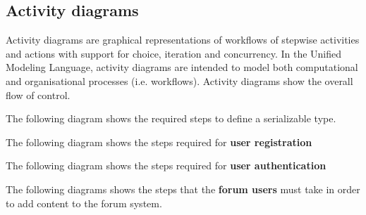 \documentclass[12pt]{report}
\renewcommand\emph{\textbf}
\begin{document}
            \subsection{Activity diagrams}
                Activity diagrams are graphical representations of workflows of stepwise activities and actions with support for choice, iteration and concurrency.
                In the Unified Modeling Language, activity diagrams are intended to model both computational and organisational processes (i.e. workflows).
                Activity diagrams show the overall flow of control.

                \newpage

                The following diagram shows the required steps to define a serializable type.


                \newpage

                The following diagram shows the steps required for \emph{user registration}


                \newpage

                The following diagram shows the steps required for \emph{user authentication}


                \newpage

                The following diagrams shows the steps that the \emph{forum users} must take in order to add content to the forum system.

\end{document}
